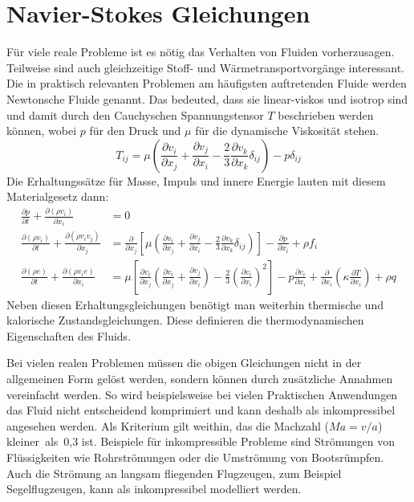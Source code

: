 \section{Navier-Stokes Gleichungen}

Für viele reale Probleme ist es nötig das Verhalten von Fluiden vorherzusagen.
Teilweise sind auch gleichzeitige Stoff- und Wärmetransportvorgänge interessant.
Die in praktisch relevanten Problemen am häufigsten auftretenden Fluide werden Newtonsche Fluide genannt.
Das bedeuted, dass sie linear-viskos und isotrop sind und damit durch den Cauchyschen
Spannungstensor $T$ beschrieben werden können, wobei $p$ für den Druck und $\mu$ für die dynamische Viskosität stehen.
\begin{equation}
  T_{ij} = \mu\left({\frac{\partial v_i}{\partial x_j}
  + \frac{\partial v_j}{\partial x_i}
-\frac{2}{3} \frac{\partial v_k}{\partial x_k} \delta_{ij}}\right)
-p\delta_{ij}
\end{equation}
Die
Erhaltungssätze für Masse, Impuls und innere Energie lauten mit diesem Materialgesetz dann:
\begin{align}
  \frac{\partial p}{\partial t} + \frac{\partial (\rho v_i)}{\partial x_i} &= 0\\
  \frac{\partial (\rho v_i)}{\partial t} + \frac{\partial (\rho v_i v_j)}{\partial x_j} &=
  \frac{\partial}{\partial x_j} \left[{\mu
  \left({\frac{\partial v_i}{\partial x_j}
  +\frac{\partial v_j}{\partial x_i}
  - \frac{2}{3} \frac{\partial v_k}{\partial x_k}\delta_{ij}}\right)}\right]
  -\frac{\partial p}{\partial x_i} + \rho f_i\\
  \frac{\partial (\rho e)}{\partial t} + \frac{\partial (\rho v_i e)}{\partial x_i} &=
  \mu \left[{\frac{\partial v_i}{\partial x_j}
  \left({\frac{\partial v_i}{\partial x_j}
  +\frac{\partial v_j}{\partial x_i}}\right)
  - \frac{2}{3} \left({\frac{\partial v_i}{\partial x_i}}\right)^2}\right]
  -p\frac{\partial v_i}{\partial x_i} +\frac{\partial}{\partial x_i}
  \left({\kappa \frac{\partial T}{\partial x_i}}\right)
  + \rho q
\end{align}
Neben diesen Erhaltungsgleichungen benötigt man weiterhin thermische und kalorische Zustands\-gleich\-ungen.
Diese definieren die thermodynamischen Eigenschaften des Fluids.

Bei
vielen realen Problemen müssen die obigen Gleichungen nicht in der allgemeinen Form gelöst werden, sondern
können durch zusätzliche Annahmen vereinfacht werden.
So wird beispielsweise bei vielen Praktischen Anwendungen das Fluid nicht entscheidend komprimiert
und kann deshalb als inkompressibel angesehen werden. Als Kriterium gilt weithin,
das die Machzahl ($Ma = v/a$) kleiner~als~0,3 ist. Beispiele für inkompressible Probleme
sind Strömungen von Flüssigkeiten wie Rohrströmungen oder die Umströmung von Bootsrümpfen.
Auch die Strömung an langsam fliegenden Flugzeugen, zum Beispiel Segelflugzeugen, kann als
inkompressibel modelliert werden.

